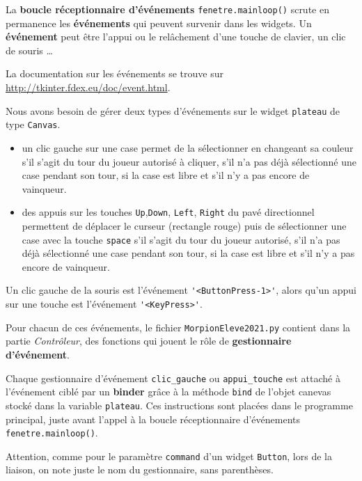 \documentclass[a4paper, french, 12pt]{article}  %
\begin{document}
La \textbf{boucle réceptionnaire d'événements} \lstinline+fenetre.mainloop()+ scrute en permanence les \textbf{événements} qui peuvent survenir dans les  widgets.  Un \textbf{événement}  peut être l'appui ou le relâchement d'une touche de clavier, un clic de souris \ldots 

La documentation sur les événements se trouve sur \url{http://tkinter.fdex.eu/doc/event.html}.

Nous avons besoin de gérer deux types d'événements sur le widget \lstinline+plateau+ de type \lstinline+Canvas+.

\begin{itemize}[label=]

	\item un clic gauche sur une case permet de la sélectionner en changeant sa couleur s'il s'agit du tour du joueur autorisé à cliquer, s'il n'a pas déjà sélectionné une case pendant son tour, si la case est libre  et s'il n'y a pas encore de vainqueur.
	
	\item des appuis sur les touches \lstinline+Up+,\lstinline+Down+, \lstinline+Left+, \lstinline+Right+ du pavé directionnel permettent de déplacer le curseur (rectangle rouge) puis de sélectionner une case avec la touche \lstinline+space+ s'il s'agit du tour du joueur autorisé, s'il n'a pas déjà sélectionné une case pendant son tour, si la case est libre  et s'il n'y a pas encore de vainqueur.

\end{itemize}

Un clic gauche de la souris  est l'événement \lstinline+'<ButtonPress-1>'+, alors qu'un appui sur une touche est l'événement \lstinline+'<KeyPress>'+.


Pour chacun de ces événements, le fichier \texttt{MorpionEleve2021.py} contient dans la partie \textit{Contrôleur}, des fonctions qui jouent le rôle de \textbf{gestionnaire d'événement}.

Chaque gestionnaire d'événement \lstinline+clic_gauche+ ou \lstinline+appui_touche+ est attaché à l'événement ciblé par un \textbf{binder} grâce à la méthode \lstinline+bind+ de l'objet canevas stocké dans la variable \lstinline+plateau+. Ces instructions sont placées dans le programme principal, juste   avant l'appel à la boucle réceptionnaire d'événements \lstinline+fenetre.mainloop()+.

\bcattention{} Attention, comme pour le paramètre \lstinline+command+ d'un widget \lstinline+Button+, lors de la liaison, on note juste  le nom du gestionnaire, sans parenthèses.
\end{document}
